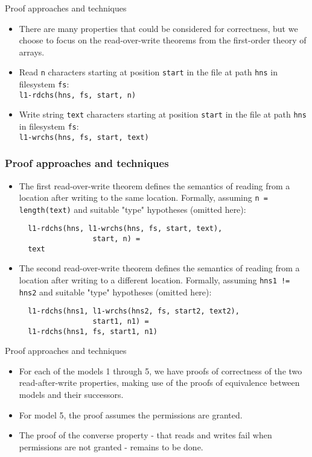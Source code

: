 \documentclass{beamer}
\begin{document}
\begin{frame}{Proof approaches and techniques}
  \begin{itemize}
  \item There are many properties that could be considered for
    correctness, but we choose to focus on the read-over-write
    theorems from the first-order theory of arrays.
  \item Read \texttt{n} characters starting at position \texttt{start}
    in the file at path \texttt{hns} in filesystem \texttt{fs}: \\
    \texttt{l1-rdchs(hns, fs, start, n)}
  \item Write string \texttt{text} characters starting at position \texttt{start}
    in the file at path \texttt{hns} in filesystem \texttt{fs}: \\
    \texttt{l1-wrchs(hns, fs, start, text)}
  \end{itemize}
\end{frame}
\begin{frame}[fragile]
  \frametitle{Proof approaches and techniques}
  \begin{itemize}
  \item The first read-over-write theorem defines the semantics of
    reading from a location after writing to the same
    location. Formally, assuming \texttt{n =
      length(text)} and suitable "type" hypotheses (omitted here): \\
\begin{verbatim}
  l1-rdchs(hns, l1-wrchs(hns, fs, start, text),
                 start, n) =
  text
\end{verbatim}
  \item The second read-over-write theorem defines the semantics of
    reading from a location after writing to a different
    location. Formally, assuming \texttt{hns1 != hns2} and suitable "type"
    hypotheses (omitted here):\\
\begin{verbatim}
  l1-rdchs(hns1, l1-wrchs(hns2, fs, start2, text2),
                 start1, n1) =
  l1-rdchs(hns1, fs, start1, n1)
\end{verbatim}
  \end{itemize}
\end{frame}

\begin{frame}{Proof approaches and techniques}
  \begin{itemize}
  \item For each of the models 1 through 5, we have proofs of correctness of
    the two read-after-write properties, making use of the proofs of
    equivalence between models and their successors.
  \item For model 5, the proof assumes the permissions are
    granted.
  \item The proof of the converse property - that reads and writes
    fail when permissions are not granted - remains to be done.
  \end{itemize}
\end{frame}
\end{document}
